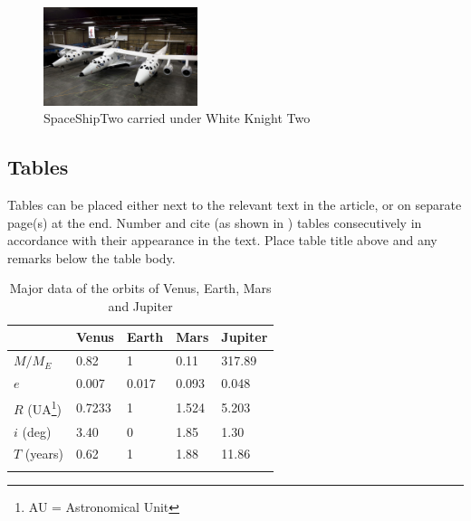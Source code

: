 \documentclass{IACpaper}
\begin{document}
      \begin{figure}[H]
        \begin{center}
          \includegraphics[width=0.4\textwidth]{figexample}
        \end{center}
        \caption{SpaceShipTwo carried under White Knight Two}
        \label{fig:example}
      \end{figure}

    \subsection{Tables}

      Tables can be placed either next to the relevant text in the article, or on separate page(s) at the end. Number and cite (as shown in ) tables consecutively in accordance with their appearance in the text. Place table title above and any remarks below the table body.

      \begin{table}[H]
        \caption{Major data of the orbits of Venus, Earth, Mars and Jupiter}
        \begin{center}
          \begin{minipage}{\linewidth}

            \renewcommand\footnoterule{}
  					\renewcommand\thempfootnote{*}

            \begin{tabularx}{\linewidth}{lXXXX}
              \Xhline{3\arrayrulewidth}
              & Venus & Earth & Mars & Jupiter\\
              \hline
              $M/M_E$     & 0.82   & 1     & 0.11  & 317.89\\
              $e$         & 0.007  & 0.017 & 0.093 & 0.048\\
              $R$ (UA\footnote{AU = Astronomical Unit})         & 0.7233 & 1     & 1.524 & 5.203 \\
              $i$ (deg)   & 3.40   & 0     & 1.85  & 1.30\\
              $T$ (years) & 0.62   & 1     & 1.88  & 11.86\\
              \Xhline{4\arrayrulewidth}
            \end{tabularx}
          \end{minipage}
        \end{center}
        \label{tab:example}
      \end{table}
\end{document}
